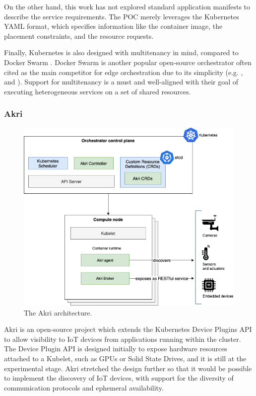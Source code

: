 On the other hand, this work has not explored standard application manifests to describe the service requirements. The POC merely leverages the Kubernetes YAML format, which specifies information like the container image, the placement constraints, and the resource requests.

Finally, Kubernetes is also designed with multitenancy in mind, compared to Docker Swarm \cite{docker-swarm}. Docker Swarm is another popular open-source orchestrator often cited as the main competitor for edge orchestration due to its simplicity (e.g. \cite{bellavista2017feasibility}, and \cite{ismail2015evaluation}). Support for multitenancy is a must and well-aligned with their goal of executing heterogeneous services on a set of shared resources.

\subsubsection{Akri}
\label{sec:akri}

\begin{figure}[ht]
\centering
\includegraphics[width=\columnwidth]{figures/akri}
\caption{The Akri architecture.}
\label{fig:akri}
\end{figure}

Akri \cite{akri} is an open-source project which extends the Kubernetes Device Plugins API \cite{k8s-device-plugins} to allow visibility to IoT devices from applications running within the cluster. The Device Plugin API is designed initially to expose hardware resources attached to a Kubelet, such as GPUs or Solid State Drives, and it is still at the experimental stage. Akri stretched the design further so that it would be possible to implement the discovery of IoT devices, with support for the diversity of communication protocols and  ephemeral availability.

